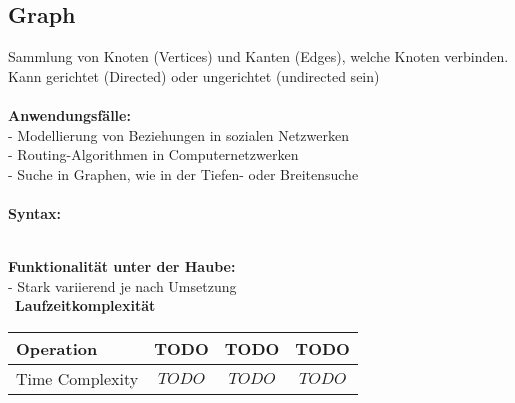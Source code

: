 \documentclass[../main.tex]{subfiles}
\begin{document}
	\subsection{Graph}
	Sammlung von Knoten (Vertices) und Kanten (Edges), welche Knoten verbinden.
	Kann gerichtet (Directed) oder ungerichtet (undirected sein)\\\\
	\textbf{Anwendungsfälle:}\\
	- Modellierung von Beziehungen in sozialen Netzwerken\\
	- Routing-Algorithmen in Computernetzwerken\\
	- Suche in Graphen, wie in der Tiefen- oder Breitensuche\\\\
	\textbf{Syntax:}
	 
	\\
	\textbf{Funktionalität unter der Haube:}\\
	- Stark variierend je nach Umsetzung\\\
	\textbf{Laufzeitkomplexität}\\
	\begin{table}[ht]
		\centering
		\begin{tabular}{l *{3}{c}}
			\toprule
			Operation & TODO & TODO & TODO \\
			\midrule
			Time Complexity & $TODO$ & $TODO$ & $TODO$\\
			\bottomrule
		\end{tabular}
	\end{table}
	\clearpage
\end{document}
